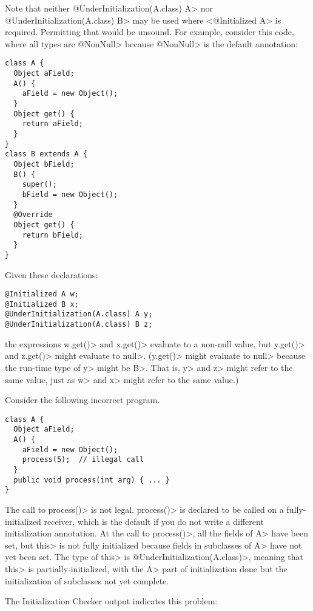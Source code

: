 Note that neither \<@UnderInitialization(A.class) A> nor
\<@UnderInitialization(A.class) B> may be used where <@Initialized A> is
required.  Permitting that would be unsound.  For example, consider this
code, where all types are \<@NonNull> because \<@NonNull> is the default annotation:

\begin{Verbatim}
class A {
  Object aField;
  A() {
    aField = new Object();
  }
  Object get() {
    return aField;
  }
}
class B extends A {
  Object bField;
  B() {
    super();
    bField = new Object();
  }
  @Override
  Object get() {
    return bField;
  }
}
\end{Verbatim}

Given these declarations:

\begin{Verbatim}
@Initialized A w;
@Initialized B x;
@UnderInitialization(A.class) A y;
@UnderInitialization(A.class) B z;
\end{Verbatim}

\noindent
the expressions \<w.get()> and \<x.get()> evaluate to a non-null value, but
\<y.get()> and \<z.get()> might evaluate to \<null>.
(\<y.get()> might evaluate to \<null> because the run-time type of \<y>
might be \<B>.  That is, \<y> and \<z> might refer to the same value, just
as \<w> and \<x> might refer to the same value.)



Consider the following incorrect program.

\begin{Verbatim}
class A {
  Object aField;
  A() {
    aField = new Object();
    process(5);  // illegal call
  }
  public void process(int arg) { ... }
}
\end{Verbatim}

The call to \<process()> is not legal.
\<process()> is declared to be called on a fully-initialized receiver, which is
the default if you do not write a different initialization annotation.
At the call to \<process()>, all the fields of \<A> have been set,
but \<this> is not fully initialized because fields in subclasses of \<A> have
not yet been set.  The type of \<this> is \<@UnderInitialization(A.class)>,
meaning that \<this> is partially-initialized, with the \<A> part of
initialization done but the initialization of subclasses not yet complete.

The Initialization Checker output indicates this problem:

